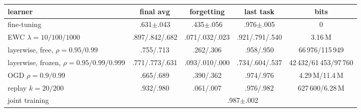 \begin{tabular}{lcccc}
\toprule
learner & final avg & forgetting & last task & bits \\
\midrule
fine-tuning & .631$\pm$.043 & .435$\pm$.056 & .976$\pm$.005 & 0 \\
EWC $\lambda=10/100/1000$ & .897/.842/.682 & .071/.032/.023 & .921/.791/.540 & 3.16\,M \\
layerwise, free, $\rho=0.95/0.99$ & .755/.713 & .262/.306 & .958/.950 & 66\,976/115\,949 \\
layerwise, frozen, $\rho=0.95/0.99/0.999$ & .771/.773/.631 & .093/.010/.000 & .734/.604/.537 & 42\,432/61\,453/97\,760 \\
OGD $\rho=0.9/0.99$ & .665/.689 & .390/.362 & .974/.976 & 4.29\,M/11.4\,M \\
replay $k=20/200$ & .932/.980 & .061/.007 & .976/.982 & 627\,600/6.28\,M \\
joint training & \multicolumn{4}{c}{.987$\pm$.002} \\
\bottomrule
\end{tabular}
